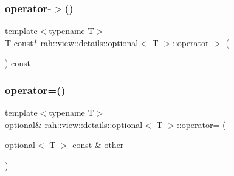 \subsubsection{\texorpdfstring{operator-\/$>$()}{operator->()}\hspace{0.1cm}{\footnotesize\ttfamily [2/2]}}
{\footnotesize\ttfamily template$<$typename T$>$ \\
T const$\ast$ \mbox{\hyperlink{structrah_1_1view_1_1details_1_1optional}{rah\+::view\+::details\+::optional}}$<$ T $>$\+::operator-\/$>$ (\begin{DoxyParamCaption}{ }\end{DoxyParamCaption}) const\hspace{0.3cm}{\ttfamily [inline]}}

\mbox{\label{structrah_1_1view_1_1details_1_1optional_a0caa7da5df6580090a3ea0ea25887dfa}} 
\subsubsection{\texorpdfstring{operator=()}{operator=()}\hspace{0.1cm}{\footnotesize\ttfamily [1/4]}}
{\footnotesize\ttfamily template$<$typename T$>$ \\
\mbox{\hyperlink{structrah_1_1view_1_1details_1_1optional}{optional}}\& \mbox{\hyperlink{structrah_1_1view_1_1details_1_1optional}{rah\+::view\+::details\+::optional}}$<$ T $>$\+::operator= (\begin{DoxyParamCaption}\item[{\mbox{\hyperlink{structrah_1_1view_1_1details_1_1optional}{optional}}$<$ T $>$ const \&}]{other }\end{DoxyParamCaption})\hspace{0.3cm}{\ttfamily [inline]}}

\mbox{\label{structrah_1_1view_1_1details_1_1optional_abb6dd0692c4b2aa874b2a7db387e7c19}} 
